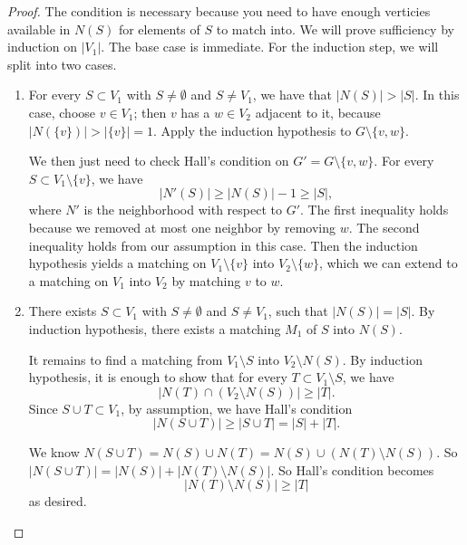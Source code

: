 \begin{proof}	
The condition is necessary because you need to have enough verticies available in $N(S)$ for elements of $S$ to match into. We will prove sufficiency by induction on $|V_1|$. The base case is immediate. For the induction step, we will split into two cases.
\begin{enumerate}[{Case }1:]
	\item For every $S\subset V_1$ with $S\neq \emptyset$ and $S\neq V_1$, we have that $|N(S)| > |S|$. 
In this case, choose  $v\in V_1$; then $v$ has a $w\in V_2$ adjacent to it, because $|N(\{v\})|> |\{v\}|=1$. Apply the induction hypothesis to $G \setminus \{v,w\}$.

We then just need to check Hall's condition on $G' =G \setminus \{v,w\}$. For every $S\subset V_1 \setminus\{v\}$, we have 
\[	
 |N'(S)| \geq |N(S)| -1 \geq |S|,
\]
 where $N'$ is the neighborhood with respect to $G'$. The first inequality holds because we removed at most one neighbor by removing $w$. The second inequality holds from our assumption in this case. Then the induction hypothesis yields a matching on $V_1\setminus \{v\}$ into $V_2\setminus \{w\}$, which we can extend to a matching on $V_1$ into $V_2$ by matching $v$ to $w$.
\item There exists $S\subset V_1$ with $S\neq \emptyset$ and $S\neq V_1$, such that $|N(S)| = |S|$. 
By induction hypothesis,  there exists a matching $M_1$ of $S$ into $N(S)$.

 It remains to find a matching from $V_1\setminus S$ into $V_2 \setminus N(S)$. By induction hypothesis, it is enough to show that for every $T\subset V_1\setminus S$, we have
\[
 |N(T)\cap (V_2 \setminus N(S))| \geq |T|.
\]
 Since $S\cup T\subset V_1$, by assumption, we have Hall's condition
\[
 |N(S\cup T)|\geq |S\cup T| = |S| + |T|.
\]

 We know $N(S\cup T) = N(S) \cup N(T) = N(S) \cup (N(T)\setminus N(S))$. So $|N(S\cup T)| = |N(S)| + |N(T)\setminus N(S)| $. So Hall's condition becomes
\[
 |N(T)\setminus N(S)| \geq |T|
\]
 as desired.\qedhere
 \end{enumerate}
\end{proof}


